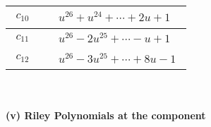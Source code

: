 \documentclass[1p]{elsarticle_modified}
\theoremstyle{definition}
\begin{document}
\begin{tabular}{m{50pt}|m{274pt}}
\hline $$\begin{aligned}c_{10}\end{aligned}$$&$\begin{aligned}
&u^{26}+u^{24}+\cdots+2 u+1
\end{aligned}$\\
\hline $$\begin{aligned}c_{11}\end{aligned}$$&$\begin{aligned}
&u^{26}-2 u^{25}+\cdots- u+1
\end{aligned}$\\
\hline $$\begin{aligned}c_{12}\end{aligned}$$&$\begin{aligned}
&u^{26}-3 u^{25}+\cdots+8 u-1
\end{aligned}$\\
\hline
\end{tabular}\\~\\
\newpage\renewcommand{\arraystretch}{1}
\flushleft \textbf{(v) Riley Polynomials at the component}\newline \\
\end{document}
